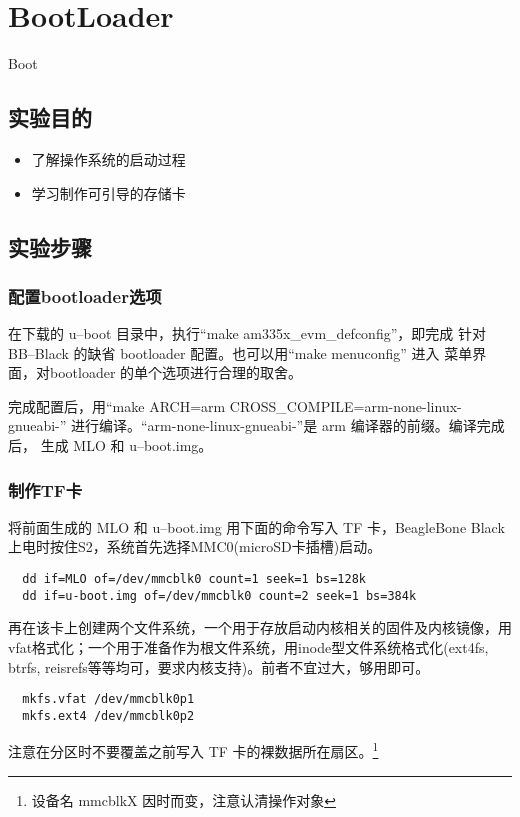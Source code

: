 \chapter{BootLoader}{Boot}

\section{实验目的}
\begin{itemize}\itemsep=-3pt
  \item 了解操作系统的启动过程
  \item 学习制作可引导的存储卡
\end{itemize}

\section{实验步骤}
\subsection{配置bootloader选项}
	在下载的 u--boot 目录中，执行``make am335x\_evm\_defconfig''，即完成
针对 BB--Black 的缺省 bootloader 配置。也可以用``make menuconfig'' 进入
菜单界面，对bootloader 的单个选项进行合理的取舍。

	完成配置后，用``make ARCH=arm CROSS\_COMPILE=arm-none-linux-gnueabi-''
进行编译。``arm-none-linux-gnueabi-''是 arm 编译器的前缀。编译完成后，
生成 MLO 和 u--boot.img。

\subsection{制作TF卡}
	将前面生成的 MLO 和 u--boot.img 用下面的命令写入 TF 卡，BeagleBone Black
上电时按住S2，系统首先选择MMC0(microSD卡插槽)启动。

\begin{verbatim}
  dd if=MLO of=/dev/mmcblk0 count=1 seek=1 bs=128k
  dd if=u-boot.img of=/dev/mmcblk0 count=2 seek=1 bs=384k
\end{verbatim}

再在该卡上创建两个文件系统，一个用于存放启动内核相关的固件及内核镜像，用
vfat格式化；一个用于准备作为根文件系统，用inode型文件系统格式化(ext4fs, btrfs,
reisrefs等等均可，要求内核支持)。前者不宜过大，够用即可。

\begin{verbatim}
  mkfs.vfat /dev/mmcblk0p1
  mkfs.ext4 /dev/mmcblk0p2
\end{verbatim}

注意在分区时不要覆盖之前写入 TF 卡的裸数据所在扇区。\footnote{设备名 mmcblkX
因时而变，注意认清操作对象}

